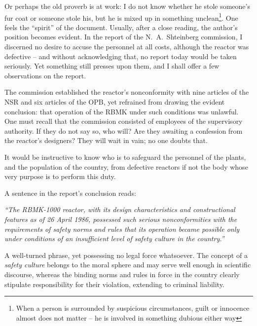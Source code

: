 \documentclass[openright]{bookest}
\begin{document}
Or perhaps the old proverb is at work: I do not know whether he stole someone's fur coat or someone stole his, but he is mixed up in something unclean\footnote{When a person is surrounded by suspicious circumstances, guilt or innocence almost does not matter -- he is involved in something dubious either way}. One feels the ``spirit'' of the document. Usually, after a close reading, the author's position becomes evident. In the report of the N.~A.~Shteinberg commission, I discerned no desire to accuse the personnel at all costs, although the reactor was defective -- and without acknowledging that, no report today would be taken seriously. Yet something still presses upon them, and I shall offer a few observations on the report.

The commission established the reactor's nonconformity with nine articles of the NSR and six articles of the OPB, yet refrained from drawing the evident conclusion: that operation of the RBMK under such conditions was unlawful. One must recall that the commission consisted of employees of the supervisory authority. If they do not say so, who will? Are they awaiting a confession from the reactor's designers? They will wait in vain; no one doubts that.

It would be instructive to know who is to safeguard the personnel of the plants, and the population of the country, from defective reactors if not the body whose very purpose is to perform this duty.

A sentence in the report's conclusion reads:

\begin{personal}
\textit{``The RBMK-1000 reactor, with its design characteristics and constructional features as of 26 April 1986, possessed such serious nonconformities with the requirements of safety norms and rules that its operation became possible only under conditions of an insufficient level of safety culture in the country.''}
\end{personal}

A well-turned phrase, yet possessing no legal force whatsoever. The concept of a \textit{safety culture} belongs to the moral sphere and may serve well enough in scientific discourse, whereas the binding norms and rules in force in the country clearly stipulate responsibility for their violation, extending to criminal liability.
\end{document}
